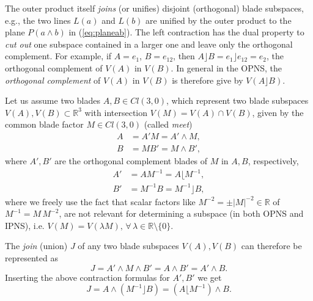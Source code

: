 \documentclass[cameraready]{jcmsi}%
\newcommand{\R}{\mathbb{R}}
\newcommand{\be}{\begin{equation}}
\newcommand{\ee}{\end{equation}}
\begin{document}
The outer product itself \textit{joins} (or unifies) disjoint (orthogonal) blade subspaces, e.g., the two lines $L(a)$ and $L(b)$ are unified by the outer product to the plane $P(a\wedge b)$ in (\ref{eq:planeab}). The left contraction has the dual property to \textit{cut out} one subspace contained in a larger one and leave only the orthogonal complement. For example, if $A=e_1$, $B=e_{12}$, then $A\rfloor B = e_1\rfloor e_{12} = e_2$, the orthogonal complement of $V(A)$ in $V(B)$. In general in the OPNS, the \textit{orthogonal complement} of $V(A)$ in $V(B)$ is therefore give by $V(A\rfloor B)$.

Let us assume two blades $A,B \in Cl(3,0)$, which represent two blade subspaces $V(A), V(B) \subset \R^3$ with intersection $V(M) = V(A)\cap V(B)$, given by the common blade factor $M \in Cl(3,0)$ (called \textit{meet})
\begin{align}
  A &= A'M = A' \wedge M, 
  \nonumber \\
  B &= MB' = M\wedge B',
\end{align}
where $A',B'$ are the orthogonal complement blades of $M$ in $A, B$, respectively,
\begin{align}
  A' &= AM^{-1} = A \lfloor M^{-1}, 
  \nonumber \\ 
  B' &= M^{-1}B=M^{-1}\rfloor B,
\end{align}
where we freely use the fact that scalar factors like $M^{-2}=\pm|M|^{-2}\in \R$ of $M^{-1}=M\, M^{-2}$, are not relevant for determining a subspace (in both OPNS and IPNS), i.e. $V(M) = V(\lambda M), \, \forall\, \lambda \in \R\setminus \{0\}$.

The \textit{join} (union) $J$ of any two blade subspaces $V(A), V(B)$ can therefore be represented as
\be 
  J = A' \wedge M \wedge B' = A \wedge B' = A' \wedge B. 
\ee 
Inserting the above contraction formulas for $A', B'$ we get
\be 
  J = A \wedge (M^{-1}\rfloor B) = (A\lfloor M^{-1})\wedge B. 
\ee 
\end{document}
